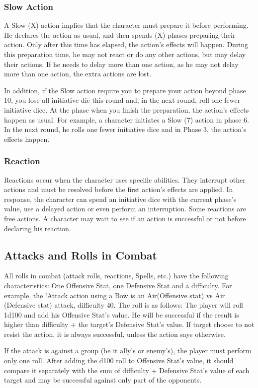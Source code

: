 \begin{multicols}{2}
\subsubsection{Slow Action}
A Slow (X) action implies that the
character must prepare it before performing. He
declares the action as usual, and then spends (X)
phases preparing their action. Only after this time
has elapsed, the action’s effects will happen.
During this preparation time, he may not react or
do any other actions, but may delay their actions.
If he needs to delay more than one action, as he
may not delay more than one action, the extra
actions are lost.

In addition, if the Slow action require you
to prepare your action beyond phase 10, you lose
all initiative die this round and, in the next round,
roll one fewer initiative dice. At the phase when
you finish the preparation, the action’s effects
happen as usual. For example, a character initiates
a Slow (7) action in phase 6. In the next round, he
rolls one fewer initiative dice and in Phase 3, the
action’s effects happen.

\subsubsection{Reaction}
Reactions occur when the character uses
specific abilities. They interrupt other actions and
must be resolved before the first action’s effects
are applied. In response, the character can spend
an initiative dice with the current phase’s value,
use a delayed action or even perform an
interruption. Some reactions are free actions. A
character may wait to see if an action is successful
or not before declaring his reaction.

\subsection{Attacks and Rolls in Combat}
All rolls in combat (attack rolls, reactions,
Spells, etc.) have the following characteristics: One
Offensive Stat, one Defensive Stat and a difficulty.
For example, the !Attack action using a Bow is an
Air(Offensive stat) vs Air (Defensive stat) attack,
difficulty 40. The roll is as follows: The player will
roll 1d100 and add his Offensive Stat’s value. He
will be successful if the result is higher than
difficulty + the target’s Defensive Stat’s value. If
target choose to not resist the action, it is always
successful, unless the action says otherwise.

If the attack is against a group (be it ally’s
or enemy’s), the player must perform only one roll.
After adding the d100 roll to Offensive Stat’s value,
it should compare it separately with the sum of
difficulty + Defensive Stat’s value of each target
and may be successful against only part of the
opponents.


\end{multicols}
